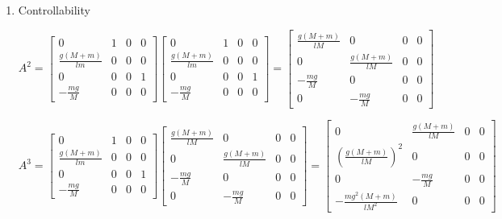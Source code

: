 \documentclass{article}
\begin{document}
\begin{enumerate}[label=\alph*)]
    \begin{enumerate}[label=\roman*)]
        \item Controllability

    \[
    A^2 = 
    \begin{bmatrix}
        0 & 1 & 0 & 0 \\
        \frac{g(M+m)}{lm} & 0 & 0 & 0 \\
        0 & 0 & 0 & 1 \\
        -\frac{mg}{M} & 0 & 0 & 0 
    \end{bmatrix}
    \begin{bmatrix}
        0 & 1 & 0 & 0 \\
        \frac{g(M+m)}{lm} & 0 & 0 & 0 \\
        0 & 0 & 0 & 1 \\
        -\frac{mg}{M} & 0 & 0 & 0 
    \end{bmatrix}
    = 
    \begin{bmatrix}
        \frac{g(M+m)}{lM} & 0 & 0 & 0 \\
        0 & \frac{g(M+m)}{lM} & 0 & 0 \\
        -\frac{mg}{M} & 0 & 0 & 0 \\
        0 & -\frac{mg}{M} & 0 & 0
    \end{bmatrix}
    \]

    \[
    A^3 = 
    \begin{bmatrix}
        0 & 1 & 0 & 0 \\
        \frac{g(M+m)}{lm} & 0 & 0 & 0 \\
        0 & 0 & 0 & 1 \\
        -\frac{mg}{M} & 0 & 0 & 0 
    \end{bmatrix}
    \begin{bmatrix}
        \frac{g(M+m)}{lM} & 0 & 0 & 0 \\
        0 & \frac{g(M+m)}{lM} & 0 & 0 \\
        -\frac{mg}{M} & 0 & 0 & 0 \\
        0 & -\frac{mg}{M} & 0 & 0
    \end{bmatrix}
    = 
    \begin{bmatrix}
        0 & \frac{g(M+m)}{lM} & 0 & 0 \\
        \left(\frac{g(M+m)}{lM}\right)^2 & 0 & 0 & 0 \\
        0 & -\frac{mg}{M} & 0 & 0 \\
        -\frac{mg^2(M+m)}{lM^2} & 0 & 0 & 0
    \end{bmatrix}
    \]


\end{enumerate}
\end{enumerate}
\end{document}
